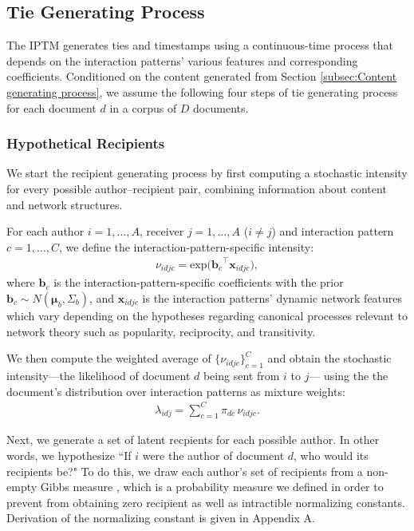 \documentclass[twoside]{article}
\begin{document}
\subsection{Tie Generating Process}\label{subsec:Tie generating process}
The IPTM generates ties and timestamps using a continuous-time process
that depends on the interaction patterns' various features and
corresponding coefficients. Conditioned on the content generated from Section \ref{subsec:Content generating process}, we assume the following four steps of tie generating process for each document $d$ in a corpus of $D$ documents.
\subsubsection{Hypothetical Recipients}\label{subsubsec:Hypothetical Recipients}
We start the recipient generating process by first computing a stochastic intensity for every possible author--recipient
pair, combining information about content and network structures. 

For each author $i = 1,\ldots,A$, receiver $j = 1,\ldots,A$ ($i \neq j$) and interaction pattern $c=1,\ldots,C$, we define the interaction-pattern-specific intensity:
\begin{align*}
\nu_{idjc} = \mbox{exp}\Big({\boldsymbol{b}_c}^{\top}\boldsymbol{x}_{idjc}\Big),
\end{align*}
where $\boldsymbol{b}_c$ is the interaction-pattern-specific coefficients with the prior $\boldsymbol{b}_c \sim N(\boldsymbol{\mu}_b,\Sigma_b)$, and $\boldsymbol{x}_{idjc}$ is the interaction patterns' dynamic network features which vary depending on the hypotheses regarding canonical processes relevant to network theory such as popularity, reciprocity, and transitivity. 

We then compute the weighted average of $\{\nu_{idjc}\}_{c=1}^C$ and obtain the stochastic intensity---the likelihood of document $d$ being sent from $i$ to $j$--- using the the document's distribution over interaction patterns as mixture weights:
\begin{align*}
\lambda_{idj} =\sum_{c=1}^{C} \pi_{dc}\, \nu_{idjc}.
\end{align*}

Next, we generate a set of latent recpients for each
possible author. In other words, we hypothesize ``If $i$ were the
author of document $d$, who would its recipients be?" To do this, we draw each author's set of recipients from a non-empty Gibbs measure \citep{fellows2017removing}, which is a probability measure we defined in order to prevent from obtaining zero recipient as well as intractible normalizing constants. Derivation of the normalizing constant is given in Appendix A. 
\end{document}
